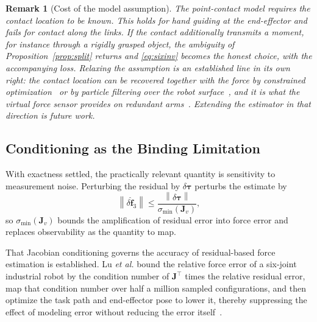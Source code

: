 \documentclass{ieeeaccess}
\newtheorem{remark}{Remark}
\newcommand{\norm}[1]{\left\| #1 \right\|}
\newcommand{\Jv}{\bm{J}_{\!v}}
\begin{document}
\begin{remark}[Cost of the model assumption]
The point-contact model requires the contact location to be known. This holds for
hand guiding at the end-effector and fails for contact along the links. If the
contact additionally transmits a moment, for instance through a rigidly grasped
object, the ambiguity of Proposition~\ref{prop:split} returns and
\eqref{eq:sixinv} becomes the honest choice, with the accompanying loss. Relaxing
the assumption is an established line in its own right: the contact location can be
recovered together with the force by constrained
optimization~\cite{likar2014contact} or by particle filtering over the
robot surface~\cite{manuelli2016cpf}, and it is what the virtual force sensor
provides on redundant arms~\cite{magrini2014virtual}. Extending the estimator in
that direction is future work.
\label{rem:cost}
\end{remark}

\subsection{Conditioning as the Binding Limitation}
\label{sec:conditioning}
With exactness settled, the practically relevant quantity is sensitivity to
measurement noise. Perturbing the residual by $\delta\bm\tau$ perturbs the
estimate by
\begin{equation}
\norm{\delta\hat{\bm f}_{3}}\le\frac{\norm{\delta\bm\tau}}{\sigma_{\min}(\Jv)} ,
\label{eq:noise}
\end{equation}
so $\sigma_{\min}(\Jv)$ bounds the amplification of residual error into force
error and replaces observability as the quantity to map.

That Jacobian conditioning governs the accuracy of residual-based force estimation
is established. Lu \emph{et al.} bound the relative force error of a six-joint
industrial robot by the condition number of $\bm J^{\!\top}$ times the relative
residual error, map that condition number over half a million sampled
configurations, and then optimize the task path and end-effector pose to lower it,
thereby suppressing the effect of modeling error without reducing the error
itself~\cite{lu2023configopt}.
\end{document}

